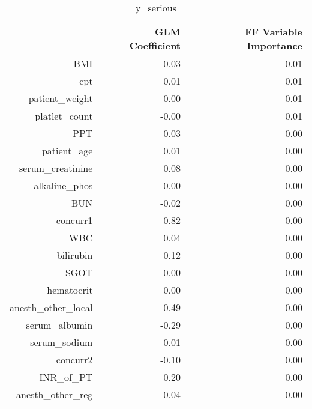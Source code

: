 \begin{table}[ht]
\centering
\begin{tabular}{rrr}
  \hline
 & GLM Coefficient & FF Variable Importance \\ 
  \hline
BMI & 0.03 & 0.01 \\ 
  cpt & 0.01 & 0.01 \\ 
  patient\_weight & 0.00 & 0.01 \\ 
  platlet\_count & -0.00 & 0.01 \\ 
  PPT & -0.03 & 0.00 \\ 
  patient\_age & 0.01 & 0.00 \\ 
  serum\_creatinine & 0.08 & 0.00 \\ 
  alkaline\_phos & 0.00 & 0.00 \\ 
  BUN & -0.02 & 0.00 \\ 
  concurr1 & 0.82 & 0.00 \\ 
  WBC & 0.04 & 0.00 \\ 
  bilirubin & 0.12 & 0.00 \\ 
  SGOT & -0.00 & 0.00 \\ 
  hematocrit & 0.00 & 0.00 \\ 
  anesth\_other\_local & -0.49 & 0.00 \\ 
  serum\_albumin & -0.29 & 0.00 \\ 
  serum\_sodium & 0.01 & 0.00 \\ 
  concurr2 & -0.10 & 0.00 \\ 
  INR\_of\_PT & 0.20 & 0.00 \\ 
  anesth\_other\_reg & -0.04 & 0.00 \\ 
   \hline
\end{tabular}
\caption{y_serious} 
\end{table}

